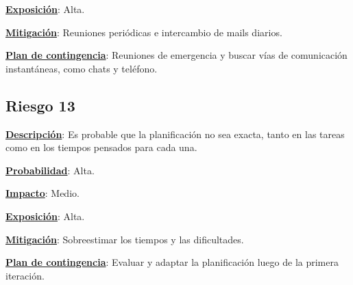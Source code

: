 \textbf{\underline{Exposición}}: Alta.

\textbf{\underline{Mitigación}}: Reuniones periódicas e intercambio de mails diarios.

\textbf{\underline{Plan de contingencia}}: Reuniones de emergencia y buscar vías de comunicación instantáneas, como chats y teléfono.

\subsection*{Riesgo 13}
\textbf{\underline{Descripción}}: Es probable que la planificación no sea exacta, tanto en las tareas como en los tiempos pensados para cada una.

\textbf{\underline{Probabilidad}}: Alta.

\textbf{\underline{Impacto}}: Medio.

\textbf{\underline{Exposición}}: Alta.

\textbf{\underline{Mitigación}}: Sobreestimar los tiempos y las dificultades.

\textbf{\underline{Plan de contingencia}}: Evaluar y adaptar la planificación luego de la primera iteración.

